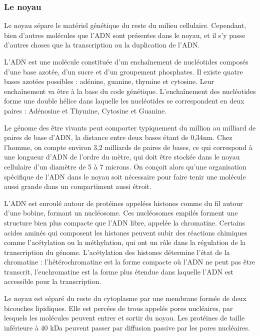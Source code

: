 \documentclass{report}
\begin{document}
\subsubsection{Le noyau}

Le noyau sépare le matériel génétique du reste du milieu cellulaire. Cependant, bien d'autres molécules que l'ADN sont présentes dans le noyau, et il s'y passe d'autres choses que la transcription ou la duplication de l'ADN. 

L'ADN est une molécule constituée d'un enchaînement de nucléotides composés d'une base azotée, d'un sucre et d'un groupement phosphates. Il existe quatre bases azotées possibles : adénine, guanine, thymine et cytosine. Leur enchaînement va être à la base du code génétique.
L'enchaînement des nucléotides forme une double hélice dans laquelle les nucléotides se correspondent en deux paires : Adénosine et Thymine, Cytosine et Guanine. 

Le génome des être vivants peut comporter typiquement du million au milliard de paires de base d'ADN, la distance entre deux bases étant de 0,34nm. Chez l'homme, on compte environ 3,2 milliards de paires de bases, ce qui correspond à une longueur d'ADN de l'ordre du mètre, qui doit être stockée dans le noyau cellulaire d'un diamètre de 5 à 7 microns. 
On conçoit alors qu'une organisation spécifique de l'ADN dans le noyau soit nécessaire pour faire tenir une molécule aussi grande dans un compartiment aussi étroit. 

L'ADN est enroulé autour de protéines appelées histones comme du fil autour d'une bobine, formant un nucléosome. Ces nucléosomes empilés forment une structure bien plus compacte que l'ADN libre, appelée la chromatine. Certains acides aminés qui composent les histones peuvent subir des réactions chimiques comme l'acétylation ou la méthylation, qui ont un rôle dans la régulation de la transcription du génome. L'acétylation des histones détermine l'état de la chromatine : l'hétérochromatine est la forme compacte où l'ADN ne peut pas être transcrit, l'euchromatine est la forme plus étendue dans laquelle l'ADN est accessible pour la transcription. 

Le noyau est séparé du reste du cytoplasme par une membrane formée de deux bicouches lipidiques. Elle est percées de trous appelés pores nucléaires, par lesquels les molécules peuvent entrer et sortir du noyau. Les protéines de taille inférieure à 40 kDa peuvent passer par diffusion passive par les pores nucléaires. 
\end{document}
